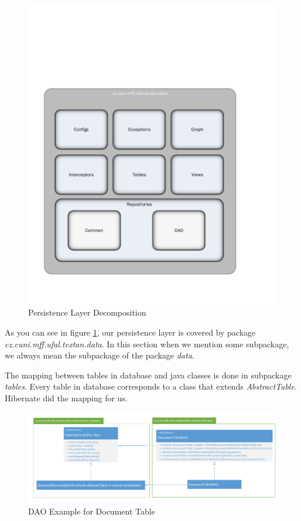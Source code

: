\begin{figure}[!htb]
        \centering
        \includegraphics[width=\textwidth]{Images/DataDecomposition}
        \caption{Persistence Layer Decomposition}
        \label{fig:DataDecomposition}
\end{figure}



As you can see in figure \ref{fig:DataDecomposition}, our persistence layer is covered by package \emph{cz.cuni.mff.ufal.textan.data}. In this section when we mention some subpackage, we always mean the subpackage of the package \emph{data}.

The mapping between tables in database and java classes is done in subpackage \emph{tables}. Every table in database corresponds to a class that extends \emph{AbstractTable}. Hibernate did the mapping for us. 

\begin{figure}[!htb]
        \centering
        \includegraphics[width=\textwidth]{Images/DatabaseDAO}
        \caption{DAO Example for Document Table}
        \label{fig:DatabaseDAO}
\end{figure}

